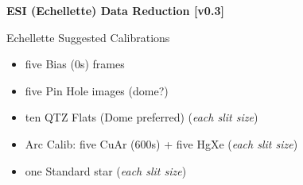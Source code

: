 \documentclass[11pt,letterpaper,dvips]{article}
\begin{document}
 

\begin{center}
{{\huge \bf ESI (Echellette) Data Reduction [v0.3]}}
\end{center}

\begin{enumerate}

{\Large   \item Echellette Suggested Calibrations }
   \begin{itemize}
	\item five Bias (0s) frames
	\item five Pin Hole images (dome?)
	\item ten QTZ Flats (Dome preferred) \quad  ({\it each slit size})
	\item Arc Calib:  five CuAr (600s) + five HgXe \quad  ({\it each slit size})
	\item one Standard star \quad ({\it each slit size})
   \end{itemize}


\end{enumerate}
\end{document}
